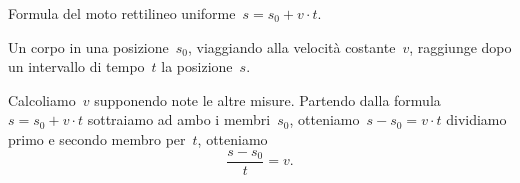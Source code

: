  \begin{esempio}
Formula del moto rettilineo uniforme~$s=s_{0}+v\cdot t$.

Un corpo in una posizione~$s_0$, viaggiando alla velocità costante~$v$, 
raggiunge dopo un intervallo di tempo~$t$ la posizione~$s$.

Calcoliamo~$v$ supponendo note le altre misure.
Partendo dalla formula~$s=s_{0}+v\cdot t$ sottraiamo ad ambo i membri~$s_0$, 
otteniamo~$s-s_{0}=v\cdot t$
dividiamo primo e secondo membro per~$t$, otteniamo \[\frac{s-s_{0}}{t}=v.\]
 \end{esempio}


% 

